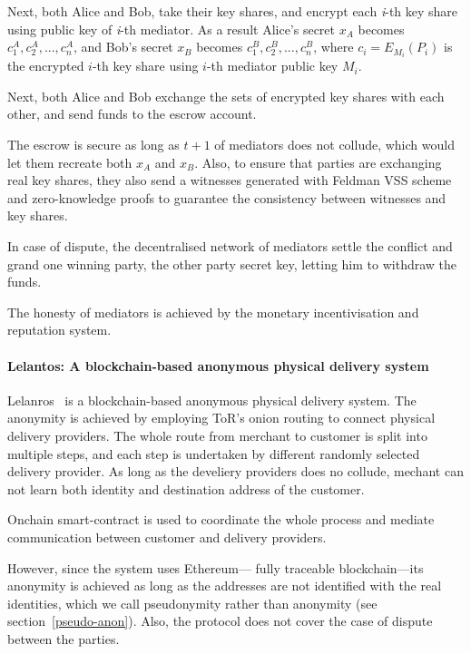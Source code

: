 \documentclass{ieeeaccess}
\begin{document}
Next, both Alice and Bob, take their key shares, and encrypt each
\textit{i}-th key share using public key of \textit{i}-th mediator. As a result
Alice's secret \(x_A\) becomes \({c^A_1, c^A_2,...,c^A_n}\), and Bob's
secret \(x_B\) becomes \({c^B_1, c^B_2,...,c^B_n}\), where
\(c_i = E_{M_i}(P_i)\) is the encrypted \(i\)-th key share using
\(i\)-th mediator public key \(M_i\).

Next, both Alice and Bob exchange the sets of encrypted key shares with
each other, and send funds to the escrow account.

The escrow is secure as long as \(t+1\) of mediators does not collude,
which would let them recreate both \(x_A\) and \(x_B\). Also, to ensure
that parties are exchanging real key shares, they also send a witnesses
generated with Feldman VSS scheme and zero-knowledge proofs to guarantee
the consistency between witnesses and key shares.

In case of dispute, the decentralised network of mediators settle the
conflict and grand one winning party, the other party secret key,
letting him to withdraw the funds.

The honesty of mediators is achieved by the monetary incentivisation and
reputation system.


\paragraph{Lelantos: A blockchain-based anonymous physical delivery
system}\label{lelantos-a-blockchain-based-anonymous-physical-delivery-system}

Lelanros~\cite{altawy2017lelantos} is a blockchain-based anonymous
physical delivery system. The anonymity is achieved by employing ToR's
onion routing to connect physical delivery providers. The whole route
from merchant to customer is split into multiple steps, and each step is
undertaken by different randomly selected delivery provider. As long as
the develiery providers does no collude, mechant can not learn both
identity and destination address of the customer.

Onchain smart-contract is used to coordinate the whole process and
mediate communication between customer and delivery providers.

However, since the system uses Ethereum— fully traceable blockchain—its anonymity is achieved as long as the addresses are not identified with the real identities, which we call pseudonymity rather than anonymity (see section~\ref{pseudo-anon}). Also, the protocol does not cover the case of dispute between the parties.
\end{document}
